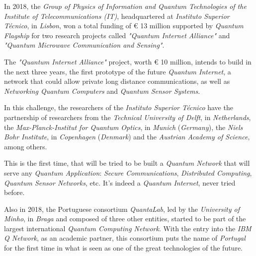 \documentclass[conference]{IEEEtran}
\begin{document}
\vspace{4pt}

In 2018, the \textit{Group of Physics of Information and Quantum Technologies of the Institute of Telecommunications (IT)}, headquartered at \textit{Instituto Superior T\'ecnico}, in \textit{Lisbon}, won a total funding of \euro\hspace{0.05mm} 13 million supported by \textit{Quantum Flagship} for two research projects called \textit{"Quantum Internet Alliance"} and \textit{"Quantum Microwave Communication and Sensing"}.

\vspace{4pt}

The \textit{"Quantum Internet Alliance"} project, worth \euro\hspace{0.05mm} 10 million, intends to build in the next three years, the first prototype of the future \textit{Quantum Internet}, a network that could allow private long distance communications, as well as \textit{Networking Quantum Computers} and \textit{Quantum Sensor Systems}.

\vspace{4pt}

In this challenge, the researchers of the \textit{Instituto Superior T\'ecnico} have the partnership of researchers from the \textit{Technical University of Delft}, in \textit{Netherlands}, the \textit{Max-Planck-Institut for Quantum Optics}, in \textit{Munich} (\textit{Germany}), the \textit{Niels Bohr Institute}, in \textit{Copenhagen} (\textit{Denmark}) and the \textit{Austrian Academy of Science}, among others.

\vspace{4pt}

This is the first time, that will be tried to be built a \textit{Quantum Network} that will serve any \textit{Quantum Application}: \textit{Secure Communications}, \textit{Distributed Computing}, \textit{Quantum Sensor Networks}, etc. It's indeed a \textit{Quantum Internet}, never tried before.

\vspace{4pt}

Also in 2018, the Portuguese consortium \textit{QuantaLab}, led by the \textit{University of Minho}, in \textit{Braga} and composed of three other entities, started to be part of the largest international \textit{Quantum Computing Network}. With the entry into the \textit{IBM Q Network}, as an academic partner, this consortium puts the name of \textit{Portugal} for the first time in what is seen as one of the great technologies of the future.
\end{document}
